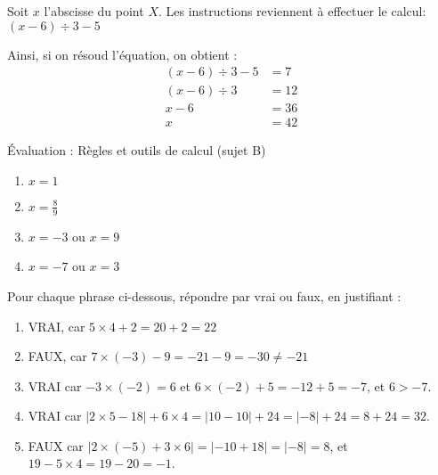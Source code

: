 \documentclass[noheader]{évaluation}
\begin{document}
\begin{exercice}
	Soit $x$ l'abscisse du point $X$. Les instructions reviennent à effectuer le calcul: $ (x - 6) ÷ 3 - 5 $

	Ainsi, si on résoud l'équation, on obtient :
	\begin{align*}
		(x - 6) ÷ 3 - 5 & = 7  \\
		(x - 6) ÷ 3     & = 12 \\
		x - 6           & = 36 \\
		x               & = 42
	\end{align*}
\end{exercice}

\newpage

\setcounter{exercice}{1}

\begin{center}
	\LARGE Évaluation : Règles et outils de calcul (sujet B)
\end{center}

\begin{exercice}
	\begin{multicols}{2}
		\begin{enumerate}
			\item $x = 1$
			\item $x = \frac{8}{9}$
			\item $x = -3$ ou $x = 9$
			\item $x = -7$ ou $x = 3$
		\end{enumerate}
	\end{multicols}
\end{exercice}

\begin{exercice}
	Pour chaque phrase ci-dessous, répondre par vrai ou faux, en justifiant :
	\begin{enumerate}
		\item VRAI, car $5 × 4 + 2 = 20 + 2 = 22$
		\item FAUX, car $7 × (-3) - 9 = -21 - 9 = -30 ≠ -21$
		\item VRAI car $-3 × (-2) = 6$ et $6 × (-2) + 5 = -12 + 5 = -7$, et $6 > -7$.
		\item VRAI car $|2 × 5 - 18| + 6 × 4 = |10 - 10| + 24 = |{-}8| + 24 = 8 + 24 = 32$.
		\item FAUX car $|2 × (-5) + 3 × 6| = |{-}10 + 18| = |{-}8| = 8$, et $19 - 5 × 4 = 19 - 20 = -1$.
	\end{enumerate}
\end{exercice}
\end{document}
